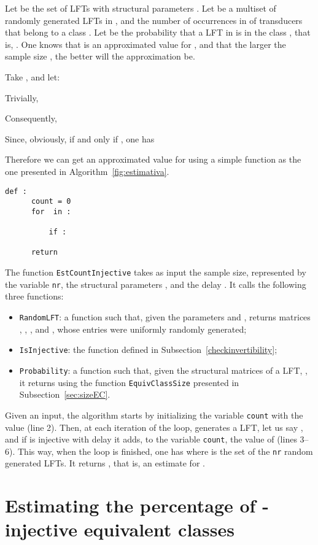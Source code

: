 \documentclass{ocg}
\newcommand{\LFT}{LFT}
\begin{document}
Let  be the set of \LFT{}s with structural
parameters . Let
 be a multiset of randomly generated \LFT{}s in
, and  the number of occurrences in
 of transducers that belong to a class
. Let  be the probability that a \LFT{} in 
is in the class , that is, . One knows that 
is an approximated value for , and that the larger the sample
size , the better will the approximation be.

Take , and let:

Trivially,

Consequently,

Since, obviously,   if and only if , one has

Therefore we can get an approximated value for 
using a simple function as the one presented in
Algorithm~\ref{fig:estimativa}.
\begin{lstlisting}[caption={Estimating the number of non-equivalent
    \LFT{}s.},label={fig:estimativa}]
  def : 
      count = 0
      for  in :
          
          if :
             
      return 
\end{lstlisting}
The function \texttt{EstCountInjective} takes as input the sample size,
represented by the variable \texttt{nr}, the structural parameters
, and the delay . It calls the following three functions:
\begin{itemize}
\item \texttt{RandomLFT}: a function such that, given the parameters
   and , returns matrices , , , and ,
  whose entries were uniformly randomly generated;
\item \texttt{IsInjective}: the function defined in
  Subsection~\ref{checkinvertibility};
\item \texttt{Probability}: a function such that, given the
  structural matrices of a \LFT{}, , it returns 
  using the function \texttt{EquivClassSize} presented in
  Subsection~\ref{sec:sizeEC}.
\end{itemize}
Given an input, the algorithm starts by initializing the variable
\texttt{count} with the value  (line 2). Then, at each iteration of
the loop, generates a \LFT{}, let us say , and if  is injective
with delay  it adds, to the variable \texttt{count}, the value
of  (lines 3--6). This way, when the loop is finished,
one has  where
 is the set of the \texttt{nr} random generated
\LFT{}s. It returns , that is, an estimate for
.

\section{Estimating the percentage of -injective equivalent
  classes}\label{EstProb}
 
\end{document}
